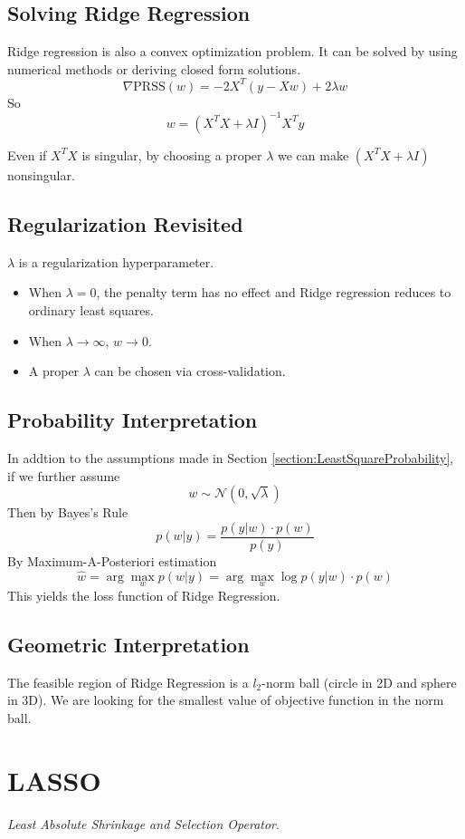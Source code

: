\subsection{Solving Ridge Regression}
Ridge regression is also a convex optimization problem. It can be solved by using numerical methods or deriving closed form solutions.
\[ \nabla\textrm{PRSS}(w) = -2X^T(y-Xw) + 2\lambda w \]
So
\[ w = (X^TX + \lambda I)^{-1}X^Ty \]
\begin{remark}
    Even if $X^TX$ is singular, by choosing a proper $\lambda$ we can make $(X^TX + \lambda I)$ nonsingular.
\end{remark}
\subsection{Regularization Revisited}
$\lambda$ is a regularization hyperparameter.
\begin{itemize}
    \item When $\lambda = 0$, the penalty term has no effect and Ridge regression reduces to ordinary least squares.
    \item When $\lambda \to \infty$, $w\to 0 $.
    \item A proper $\lambda$ can be chosen via cross-validation.
\end{itemize}
\subsection{Probability Interpretation}
In addtion to the assumptions made in Section \ref{section:LeastSquareProbability}, if we further assume
\[ w \sim \mathcal{N}(0,\sqrt{\lambda}) \]
Then by Bayes's Rule
\[ p(w|y) = \frac{p(y|w)\cdot p(w)}{p(y)} \]
By Maximum-A-Posteriori estimation
\[ \hat{w} = \arg \max_w p(w|y) = \arg \max_w \log p(y|w)\cdot p(w) \]
This yields the loss function of Ridge Regression.
\subsection{Geometric Interpretation}
The feasible region of Ridge Regression is a $l_2$-norm ball (circle in 2D and sphere in 3D). We are looking for the smallest value of objective function in the norm ball.

\section{LASSO}
\emph{Least Absolute Shrinkage and Selection Operator}.
